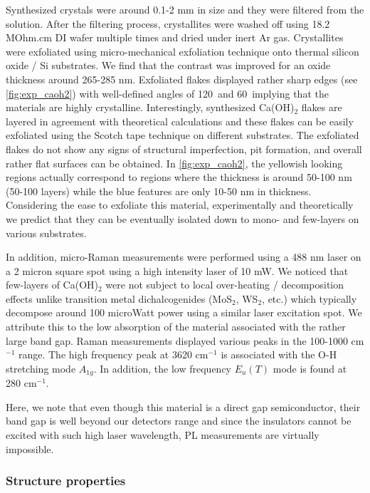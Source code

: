 Synthesized crystals were around 0.1-2 mm in size and they 
were filtered from the solution. After the filtering process, crystallites were 
washed off using 18.2 MOhm.cm DI wafer multiple times and dried under inert Ar 
gas. Crystallites were exfoliated using micro-mechanical exfoliation technique 
onto thermal silicon oxide / Si substrates. We find that the contrast 
was improved for an oxide thickness around 265-285 nm.
Exfoliated flakes displayed rather sharp edges (see \autoref{fig:exp_caoh2}) with 
well-defined angles of 120\textdegree ~and 60\textdegree ~implying that the 
materials are highly crystalline. Interestingly, synthesized Ca(OH)$_{2}$ flakes 
are layered in agreement with theoretical calculations and these flakes can be 
easily exfoliated using the Scotch tape technique on different substrates. 
The exfoliated flakes do not show any signs of structural imperfection, pit 
formation, and overall rather flat surfaces can be obtained. In \autoref{fig:exp_caoh2}, the 
yellowish looking regions actually correspond to regions where the thickness is 
around 50-100 nm (50-100 layers) while the blue features are only 10-50 nm in 
thickness. Considering the ease to exfoliate this material, experimentally and 
theoretically we predict that they can be eventually isolated down to mono- and 
few-layers on various substrates.

In addition, micro-Raman measurements were performed using a 488 nm laser on a 
2 micron square spot using a high intensity laser of 10 mW. We noticed that 
few-layers of Ca(OH)$_{2}$ were not subject to local over-heating / 
decomposition effects unlike transition metal dichalcogenides (MoS$_2$, 
WS$_2$, etc.) which typically decompose around 100 microWatt power using a 
similar laser excitation spot. We attribute this to the low absorption of the 
material associated with the rather large band gap. Raman measurements 
displayed various peaks in the 100-1000 cm$^{-1}$ range. The high frequency peak 
at 3620 cm$^{-1}$ is associated with the O-H stretching mode $A_{1g}$. In 
addition, the low frequency $E_u(T)$ mode is found at 280 cm$^{-1}$.  

Here, we note that even though this material is a direct gap semiconductor, 
their band gap is well beyond our detectors range and since the insulators 
cannot be excited with such high laser wavelength, PL measurements are 
virtually impossible.

\subsubsection{Structure properties}\label{strcuture}

